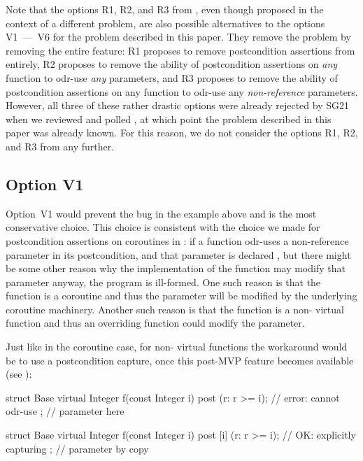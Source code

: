 Note that the options R1, R2, and R3 from \cite{P3487R0}, even though proposed in the context of a different problem,  are also possible alternatives to the options V1~---~V6 for the problem described in this paper. They remove the problem by removing the entire feature: R1 proposes to remove postcondition assertions from \cite{P2900R10} entirely, R2 proposes to remove the ability of postcondition assertions on \emph{any} function to odr-use \emph{any} parameters, and R3 proposes to remove the ability of postcondition assertions on any function to odr-use any \emph{non-reference} parameters. However, all three of these rather drastic options were already rejected by SG21 when we reviewed and polled \cite{P3487R0}, at which point the problem described in this paper was already known. For this reason, we do not consider the options R1, R2, and R3 from \cite{P3487R0} any further.

\subsection*{Option V1}

Option~V1 would prevent the bug in the example above and is the most conservative choice. This choice is consistent with the choice we made for postcondition assertions on coroutines in \cite{P2900R10}: if a function odr-uses a non-reference parameter in its postcondition, and that parameter is declared , but there might be some other reason why the implementation of the function may modify that parameter anyway, the program is ill-formed. One such reason is that the function is a coroutine and thus the parameter will be modified by the underlying coroutine machinery. Another such reason is that the function is a non- virtual function and thus an overriding function could modify the parameter.

Just like in the coroutine case, for non- virtual functions the workaround would be to use a postcondition capture, once this post-MVP feature becomes available (see \cite{P3098R0}):
\begin{codeblock}
struct Base {
  virtual Integer f(const Integer i) post (r: r >= i);     // error: cannot odr-use
};                                                         // parameter  here

struct Base {
  virtual Integer f(const Integer i) post [i] (r: r >= i); // OK: explicitly capturing 
};                                                         // parameter  by copy
\end{codeblock}

